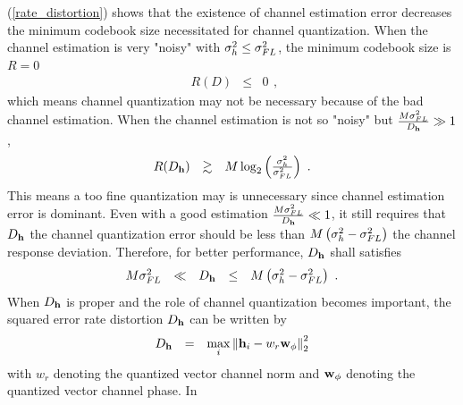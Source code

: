 \documentclass[10pt,fleqn, twocolumn]{IEEEtran}
\newcommand{\bh}{{\bf h}}
\newcommand{\bw}{{\bf w}}
\begin{document}
(\ref{rate_distortion}) shows that the existence of channel
estimation error decreases the minimum codebook size necessitated
for channel quantization. When the channel estimation is very
"noisy" with $\sigma_{h}^{2}\leq\sigma_{\mbox{\tiny FL}}^{2}$, the
minimum codebook size is $R=0$
\begin{equation}%
\begin{array}{rcl}
R\left(D\right)&\leq&0
\end{array},
\end{equation}
\noindent which means channel quantization may not be necessary
because of the bad channel estimation. When the channel estimation
is not so "noisy" but $\frac{M\sigma_{\mbox{\tiny
FL}}^{2}}{D_{\bh}}\gg 1$,
\begin{equation}%
\begin{array}{rcl}
R(D_{\bh})&\gtrsim&M\log_{2}\left(\frac{\sigma_{h}^{2}}{\sigma_{\mbox{\tiny
FL}}^{2}}\right)\ .
\end{array}
\end{equation}
\noindent This means a too fine quantization may is unnecessary
since channel estimation error is dominant. Even with a good
estimation $\frac{M\sigma_{\mbox{\tiny FL}}^{2}}{D_{\bh}}\ll 1$,
it still requires that $D_{\bh}$ the channel quantization error
should be less than $M\left(\sigma_{h}^{2}-\sigma_{\mbox{\tiny
FL}}^{2}\right)$ the channel response deviation. Therefore, for
better performance, $D_{\bh}$ shall satisfies
\begin{equation}%
\begin{array}{rcccl}
M\sigma_{\mbox{\tiny
FL}}^{2}&\ll&D_{\bh}&\leq&M\left(\sigma_{h}^{2}-\sigma_{\mbox{\tiny
FL}}^{2}\right)\ .
\end{array}
\end{equation}
\noindent When $D_{\bh}$ is proper and the role of channel
quantization becomes important, the squared error rate distortion
$D_{\bh}$ can be written by
\begin{equation}%
\begin{array}{rcl}
D_{\bh}&=&\max\limits_{i}\left\|\bh_{i}-w_{r}{\bw}_{\phi}\right\|_{2}^{2}
\end{array}\label{D_h}
\end{equation}
\noindent with $w_{r}$ denoting the quantized vector channel norm
and ${\bw}_{\phi}$ denoting the quantized vector channel phase. In
\end{document}
